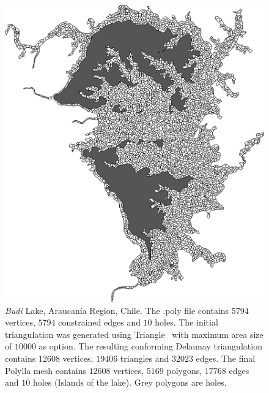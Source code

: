 \documentclass[lineno,pdflatex,sn-mathphys]{sn-jnl}%
\theoremstyle{thmstyleone}%
\theoremstyle{thmstyletwo}%
\theoremstyle{thmstylethree}%
\begin{document}
\begin{appendices}
\begin{figure}[]
    \centering
    \includegraphics[width=\textwidth]{lago_budi_Dpa10000gzn.png}
    \caption{{\em Budi} Lake, Araucanía Region, Chile. The  .poly file contains $5794$ vertices, $5794$ constrained edges and $10$ holes. The initial triangulation was generated using Triangle~\cite{triangle2d} with maximum area size of $10000$ as option. The resulting conforming Delaunay triangulation contains $12608$ vertices, $19406$ triangles and $32023$ edges. The final Polylla mesh contains $12608$ vertices, $5169$ polygons, $17768$ edges and $10$ holes (Islands of the lake). Grey polygons are holes.}
    \label{fig:budi}
\end{figure}

\end{appendices}

\clearpage

\end{document}
